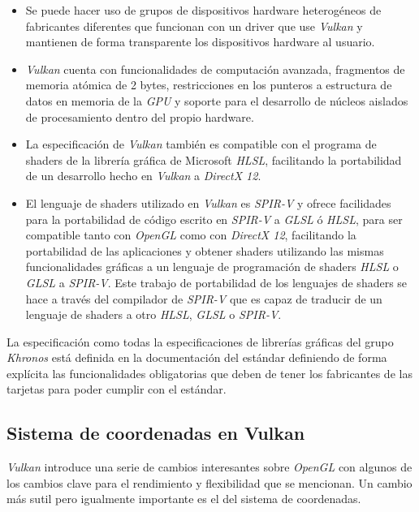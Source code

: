 \documentclass[a4paper]{book}
\begin{document}
\begin{itemize}

  \item Se puede hacer uso de grupos de dispositivos hardware heterogéneos de fabricantes diferentes que
  funcionan con un driver que use \textit{Vulkan} y mantienen de forma transparente los dispositivos hardware al usuario.

  \item \textit{Vulkan} cuenta con funcionalidades de computación avanzada, fragmentos de memoria atómica de 2 bytes, restricciones en
  los punteros a estructura de datos en memoria de la \textit{GPU} y soporte para el desarrollo de núcleos aislados de
  procesamiento dentro del propio hardware.

  \item La especificación de \textit{Vulkan} también es compatible con el programa de shaders de la librería gráfica de Microsoft
  \textit{HLSL}, facilitando la portabilidad de un desarrollo hecho en \textit{Vulkan} a \textit{DirectX 12}.

  \item El lenguaje de shaders utilizado en \textit{Vulkan} es \textit{SPIR-V} y ofrece facilidades para la portabilidad de código escrito
  en \textit{SPIR-V} a \textit{GLSL} ó \textit{HLSL}, para ser compatible tanto con \textit{OpenGL} como con \textit{DirectX 12}, facilitando
  la portabilidad de las aplicaciones y obtener shaders utilizando las mismas funcionalidades gráficas a un lenguaje de programación de
  shaders \textit{HLSL} o \textit{GLSL} a \textit{SPIR-V}. Este trabajo de portabilidad de los lenguajes de shaders se hace a través del
  compilador de \textit{SPIR-V} que es capaz de traducir de un lenguaje de shaders a otro \textit{HLSL}, \textit{GLSL} o \textit{SPIR-V}.

\end{itemize}

La especificación como todas la especificaciones de librerías gráficas del grupo \textit{Khronos} está definida en la documentación
del estándar definiendo de forma explícita las funcionalidades obligatorias que deben de tener los fabricantes de las tarjetas
para poder cumplir con el estándar.

\subsection{Sistema de coordenadas en Vulkan}
\label{subsec:SysVulkan}

\textit{Vulkan} introduce una serie de cambios interesantes sobre \textit{OpenGL} con algunos de los cambios clave para el 
rendimiento y flexibilidad que se mencionan. Un cambio más sutil pero igualmente importante es el del sistema de coordenadas.
\end{document}
